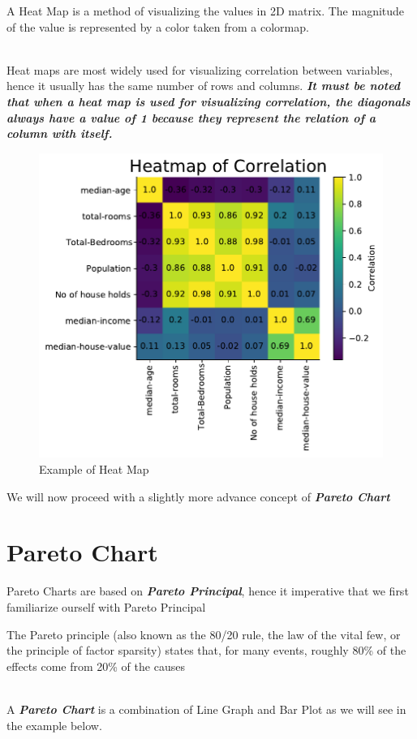 \documentclass[twoside,12pt]{report}  %
\begin{document}
\begin{tcolorbox}[colback=red!5!white, colframe=red!75!black, title = \textbf{Heat Map}]
	A Heat Map is a method of visualizing the values in 2D matrix. The magnitude of the value is represented by a color taken from a colormap.
\end{tcolorbox}
\noindent
\\
Heat maps are most widely used for visualizing correlation between variables, hence it usually has the same number of rows and columns. \textbf{\textit{It must be noted that when a heat map is used for visualizing  correlation, the diagonals always have a value of 1 because they represent the relation of a column with itself.}}

\begin{figure}[H]
	
	\centering
	\includegraphics[width=0.5\linewidth]{./images/heatmap_example.pdf}
	\caption{Example of Heat Map}
	\label{heatmap_example}

\end{figure}
\noindent
We will now proceed with a slightly more advance concept of \textbf{\textit{Pareto Chart}}

\section{Pareto Chart}

Pareto Charts are based on \textbf{\textit{Pareto Principal}}, hence it imperative that we first familiarize ourself with Pareto Principal
\\
\begin{tcolorbox}[colback=red!5!white, colframe=red!75!black, title = \textbf{Pareto Principal}]
	The Pareto principle (also known as the 80/20 rule, the law of the vital few, or the principle of factor sparsity) states that, for many events, roughly 80\% of the effects come from 20\% of the causes
\end{tcolorbox}
\noindent
\\
A \textbf{\textit{Pareto Chart}} is a combination of  Line Graph and Bar Plot as we will see in the example below.
\end{document}
